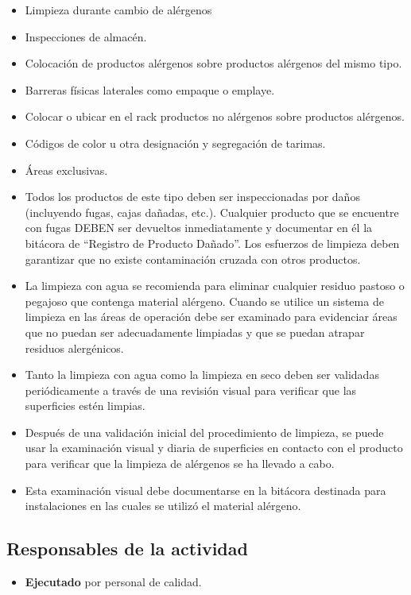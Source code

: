 \begin{itemize}
	\item Limpieza durante cambio de alérgenos
	\item Inspecciones de almacén.
	\item Colocación de productos alérgenos sobre productos alérgenos del mismo tipo.
	\item Barreras físicas laterales como empaque o emplaye.
	\item Colocar o ubicar en el rack productos no alérgenos sobre productos alérgenos.
	\item Códigos de color u otra designación y segregación de tarimas.
	\item Áreas exclusivas.
	\item Todos los productos de este tipo deben ser inspeccionadas por daños (incluyendo fugas, cajas dañadas, etc.). Cualquier producto que se encuentre con fugas DEBEN ser devueltos inmediatamente y documentar en él la bitácora de “Registro de Producto Dañado”. Los esfuerzos de limpieza deben garantizar que no existe contaminación cruzada con otros productos.
	\item La limpieza con agua se recomienda para eliminar cualquier residuo pastoso o pegajoso que contenga material alérgeno. Cuando se utilice un sistema de limpieza en las áreas de operación debe ser examinado para evidenciar áreas que no puedan ser adecuadamente limpiadas y que se puedan atrapar residuos alergénicos.
	\item Tanto la limpieza con agua como la limpieza en seco deben ser validadas periódicamente a través de una revisión visual para verificar que las superficies estén limpias.
	\item Después de una validación inicial del procedimiento de limpieza, se puede usar la examinación visual y diaria de superficies en contacto con el producto para verificar que la limpieza de alérgenos se ha llevado a cabo.
	\item Esta examinación visual debe documentarse en la bitácora destinada para instalaciones en las cuales se utilizó el material alérgeno.
\end{itemize}

\subsection{Responsables de la actividad}
\begin{itemize}
	\item \textbf{Ejecutado} por personal de calidad.
\end{itemize}

